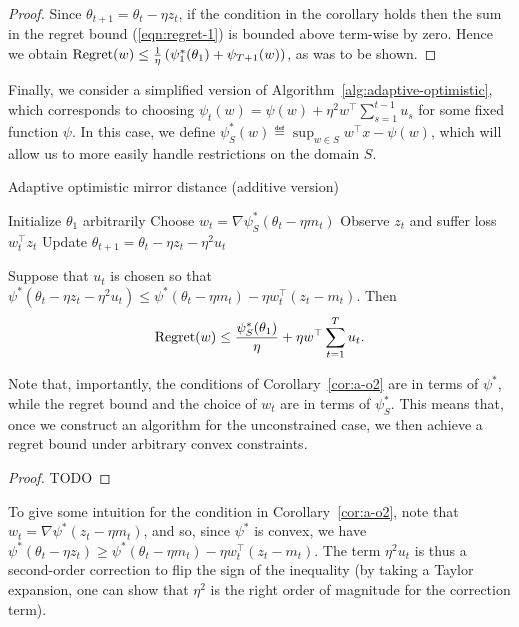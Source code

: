 \documentclass[paper_icml.tex]{subfiles}
\begin{document}
\begin{proof}
Since $\theta_{t+1} = \theta_t - \eta z_t$, if the condition in the corollary 
holds then the sum in the regret bound (\ref{eqn:regret-1}) is bounded above 
term-wise by zero. 
Hence we obtain $\operatorname{Regret}(w) \leq \frac{1}{\eta}\left(\psi_1^*(\theta_1) + \psi_{T+1}(w)\right)$, as was to be shown.
\end{proof}
Finally, we consider a simplified version of Algorithm~\ref{alg:adaptive-optimistic}, 
which corresponds to choosing $\psi_t(w) = \psi(w) + \eta^2 w^{\top} \sum_{s=1}^{t-1} u_s$ 
for some fixed function $\psi$. In this case, we define 
$\psi_S^*(w) \eqdef \sup_{w \in S} w^{\top}x - \psi(w)$, which 
will allow us to more easily handle restrictions on the domain $S$.

\begin{algorithm}
\caption{Adaptive optimistic mirror distance (additive version)}
\label{alg:a-o2}

\begin{algorithmic}
\STATE Initialize $\theta_1$ arbitrarily
  \STATE Choose $w_t = \nabla \psi_S^*(\theta_t - \eta m_t)$
  \STATE Observe $z_t$ and suffer loss $w_t^{\top}z_t$
  \STATE Update $\theta_{t+1} = \theta_t - \eta z_t - \eta^2 u_t$
\ENDFOR
\end{algorithmic}
\end{algorithm}

\begin{corollary}
\label{cor:a-o2}
Suppose that $u_t$ is chosen so that $\psi^*(\theta_t - \eta z_t - \eta^2 u_t) \leq \psi^*(\theta_t - \eta m_t) - \eta w_t^{\top}(z_t - m_t)$. 
Then 
\begin{equation}
\operatorname{Regret}(w) \leq \frac{\psi_S^*(\theta_1)}{\eta} + \eta w^{\top} \sum_{t=1}^T u_t.
\end{equation}
\end{corollary}
Note that, importantly, the conditions of Corollary~\ref{cor:a-o2} are in terms 
of $\psi^*$, while the regret bound and the choice of $w_t$ are in terms of 
$\psi_S^*$. This means that, once we construct an algorithm for the 
unconstrained case, we then achieve a regret bound under arbitrary convex 
constraints.
\begin{proof}
TODO
\end{proof}
To give some intuition for the condition in Corollary~\ref{cor:a-o2}, note that 
$w_t = \nabla \psi^*(z_t - \eta m_t)$, and so, since $\psi^*$ is convex, we have
$\psi^*(\theta_t - \eta z_t) \geq \psi^*(\theta_t - \eta m_t) - \eta w_t^{\top}(z_t - m_t)$. 
The term $\eta^2 u_t$ is thus a second-order correction to flip the sign of the inequality 
(by taking a Taylor expansion, one can show that $\eta^2$ is the right order of magnitude for 
the correction term). 
\end{document}

